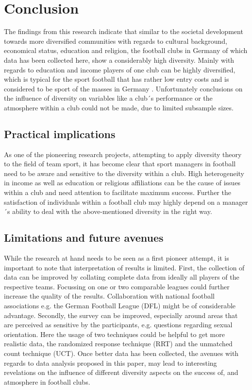\documentclass[	
	12pt, %
	a4paper, %
]{scrartcl}\usepackage[]{graphicx}\usepackage[]{color}
\begin{document}
\section{Conclusion}
\label{sec:conclusion}
The findings from this research indicate that similar to the societal development towards more diversified communities with regards to cultural background, economical status, education and religion, the football clubs in Germany of which data has been collected here, show a considerably high diversity. Mainly with regards to education and income players of one club can be highly diversified, which is typical for the sport football that has rather low entry costs and is considered to be sport of the masses in Germany \cite{Breuer2010}. Unfortunately conclusions on the influence of diversity on variables like a club´s performance or the atmosphere within a club could not be made, due to limited subsample sizes.
\subsection{Practical implications}
As one of the pioneering research projects, attempting to apply diversity theory to the field of team sport, it has become clear that sport managers in football need to be aware and sensitive to the diversity within a club. High heterogeneity in income as well as education or religious affiliations can be the cause of issues within a club and need attention to facilitate maximum success. Further the satisfaction of individuals within a football club may highly depend on a manager´s ability to deal with the above-mentioned diversity in the right way.
\subsection{Limitations and future avenues}
While the research at hand needs to be seen as a first pioneer attempt, it is important to note that interpretation of results is limited. First, the collection of data can be improved by collating complete data from ideally all players of the respective teams. Focussing on one or two comparable leagues could further increase the quality of the results. Collaboration with national football associations e.g. the German Football League (DFL) might be of considerable advantage. Secondly, the survey can be improved, especially around areas that are perceived as sensitive by the participants, e.g. questions regarding sexual orientation. Here the usage of two techniques could be helpful to get more realistic data, the randomized response technique (RRT) and the unmatched count technique (UCT). Once better data has been collected, the avenues with regards to data analysis proposed in this paper, may lead to interesting revelations on the influence of different diversity aspects on the success of, and atmosphere in football clubs.


\renewcommand{\bibliographytypesize}{\small} %
\end{document}
